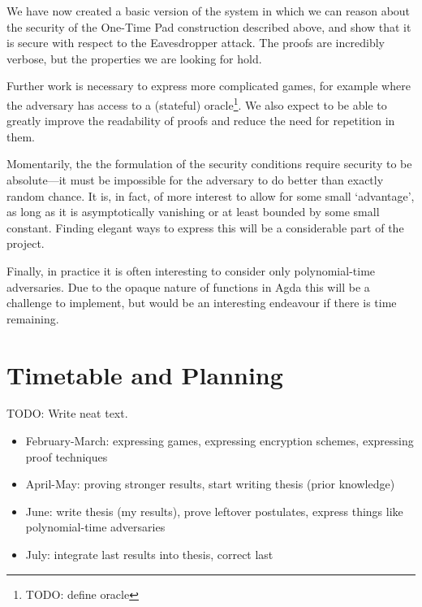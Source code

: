 \documentclass{report}
\begin{document}
We have now created a basic version of the system in which we can reason about the security of the One-Time Pad
construction described above, and show that it is secure with respect to the Eavesdropper attack.  The proofs are
incredibly verbose, but the properties we are looking for hold.  

Further work is necessary to express more complicated games, for example where the adversary has access to a
(stateful) oracle\footnote{TODO: define oracle}.  We also expect to be able to greatly improve the readability of
proofs and reduce the need for repetition in them.

Momentarily, the the formulation of the security conditions require security to be absolute---it must be impossible
for the adversary to do better than exactly random chance.  It is, in fact, of more interest to allow for some small
`advantage', as long as it is asymptotically vanishing or at least bounded by some small constant.  Finding elegant
ways to express this will be a considerable part of the project.

Finally, in practice it is often interesting to consider only polynomial-time adversaries.  Due to the opaque nature
of functions in Agda this will be a challenge to implement, but would be an interesting endeavour if there is
time remaining.

\section{Timetable and Planning}

TODO: Write neat text.
\begin{itemize}
    \itemsep0em
    \item February-March: expressing games, expressing encryption schemes, expressing proof techniques
    \item April-May: proving stronger results, start writing thesis (prior knowledge)
    \item June: write thesis (my results), prove leftover postulates, express things like polynomial-time adversaries
    \item July: integrate last results into thesis, correct last
\end{itemize}


    
    
\end{document}
